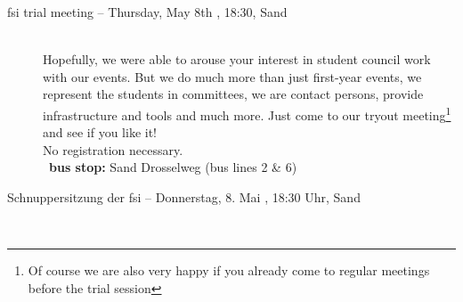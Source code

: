 \begin{description}


\ifkogwiss
\else
    \ifml
        \item[fsi trial meeting -- Thursday, May 8th \YEAR, 18:30, Sand]~\\ %
        Hopefully, we were able to arouse your interest in student council work with our events.
        But we do much more than just first-year events, we represent the students in committees,
        we are contact persons, provide infrastructure and tools and much more.
        Just come to our tryout meeting\footnote{Of course we are also very happy if you already come to regular meetings before the trial session}
        and see if you like it!\\
        No registration necessary.\\
        ~\textbf{bus stop:} Sand Drosselweg (bus lines 2 \& 6)
    \else
        \item[Schnuppersitzung der fsi -- Donnerstag, 8. Mai \YEAR, 18:30 Uhr, Sand]~\\ %

\end{description}
